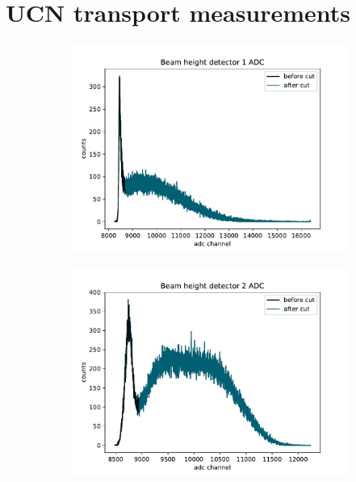 \section{UCN transport measurements}


\begin{figure}
\centering
\begin{subfigure}{.5\textwidth}
  \centering
  \includegraphics[width=\textwidth]{figures/2021_beam_det_1_adc.pdf}
  \caption{}\label{subfig:beam_det_1_adc}
\end{subfigure}%
\begin{subfigure}{.5\textwidth}
  \centering
  \includegraphics[width=\textwidth]{figures/2021_beam_det_2_adc.pdf}

\end{subfigure}
\end{figure}

